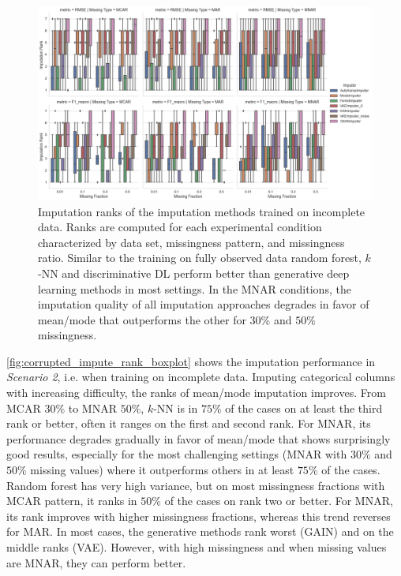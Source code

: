 \documentclass[utf8]{frontiersSCNS} %
\begin{document}
\begin{figure}\centering
	\includegraphics[width=1\columnwidth]{corrupted_impute_rank_boxplot}
	\caption{Imputation ranks of the  imputation methods trained on incomplete data. Ranks are computed for each experimental condition characterized by data set, missingness pattern, and missingness ratio. Similar to the training on fully observed data random forest, $k$-NN and discriminative DL perform better than generative deep learning methods in most settings. In the MNAR conditions, the imputation quality of all imputation approaches degrades in favor of mean/mode that outperforms the other for $30\%$ and $50\%$ missingness.}
	\label{fig:corrupted_impute_rank_boxplot}
\end{figure}

\autoref{fig:corrupted_impute_rank_boxplot} shows the imputation performance in \textit{Scenario 2}, i.e. when training on incomplete data. Imputing categorical columns with increasing difficulty, the ranks of mean/mode imputation improves. From MCAR $30\%$ to MNAR $50\%$, $k$-NN is in $75\%$ of the cases on at least the third rank or better, often it ranges on the first and second rank. For MNAR, its performance degrades gradually in favor of mean/mode that shows surprisingly good results, especially for the most challenging settings (MNAR with $30\%$ and $50\%$ missing values) where it outperforms others in at least $75\%$ of the cases. Random forest has very high variance, but on most missingness fractions with MCAR pattern, it ranks in $50\%$ of the cases on rank two or better. For MNAR, its rank improves with higher missingness fractions, whereas this trend reverses for MAR. In most cases, the generative methods rank worst (GAIN) and on the middle ranks (VAE). However, with high missingness and when missing values are MNAR, they can perform better.
\end{document}
